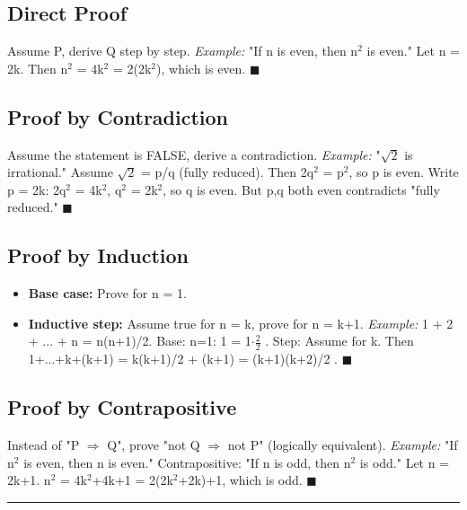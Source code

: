 \documentclass[12pt,a4paper,openany]{book}
\begin{document}
\subsection{Direct Proof}
Assume P, derive Q step by step.
\textit{Example:} "If n is even, then n$^2$ is even." Let n = 2k. Then n$^2$ = 4k$^2$ = 2(2k$^2$), which is even. $\blacksquare$

\subsection{Proof by Contradiction}
Assume the statement is FALSE, derive a contradiction.
\textit{Example:} "$\sqrt{2}$ is irrational." Assume $\sqrt{2}$ = p/q (fully reduced). Then 2q$^2$ = p$^2$, so p is even. Write p = 2k: 2q$^2$ = 4k$^2$, q$^2$ = 2k$^2$, so q is even. But p,q both even contradicts "fully reduced." $\blacksquare$

\subsection{Proof by Induction}
\begin{itemize}
  \item \textbf{Base case:} Prove for n = 1.
  \item \textbf{Inductive step:} Assume true for n = k, prove for n = k+1.
\textit{Example:} 1 + 2 + ... + n = n(n+1)/2. Base: n=1: 1 = 1$\cdot$$\frac{2}{2}$ . Step: Assume for k. Then 1+...+k+(k+1) = k(k+1)/2 + (k+1) = (k+1)(k+2)/2 . $\blacksquare$
\end{itemize}

\subsection{Proof by Contrapositive}
Instead of "P $\Longrightarrow$ Q", prove "not Q $\Longrightarrow$ not P" (logically equivalent).
\textit{Example:} "If n$^2$ is even, then n is even." Contrapositive: "If n is odd, then n$^2$ is odd." Let n = 2k+1. n$^2$ = 4k$^2$+4k+1 = 2(2k$^2$+2k)+1, which is odd.  $\blacksquare$

\bigskip\noindent\rule{\textwidth}{0.4pt}\bigskip
\end{document}
